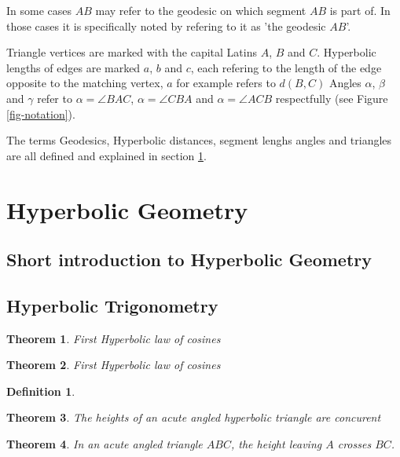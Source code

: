 \documentclass[a4paper,10pt]{article}
\newtheorem{theorem}{Theorem}[section]
\newtheorem{definition}{Definition}[section]
\begin{document}
In some cases $AB$ may refer to the geodesic on which segment $AB$ is part of.
In those cases it is specifically noted by refering to it as 'the geodesic $AB$'.

Triangle vertices are marked with the capital Latins $A$, $B$ and $C$.
Hyperbolic lengths of edges are marked $a$, $b$ and $c$, each refering to 
the length of the edge opposite
to the matching vertex, $a$ for example refers to $d\left(B, C\right)$ 
Angles $\alpha$, $\beta$ and $\gamma$ refer to $\alpha = \angle BAC$, 
$\alpha = \angle CBA$ and $\alpha = \angle ACB$ respectfully
(see Figure \ref{fig-notation}).

The terms Geodesics, Hyperbolic distances, segment lenghs angles and 
triangles are all defined and explained in section \ref{sec-hyperbolicgeom}.


\section{Hyperbolic Geometry}
\label{sec-hyperbolicgeom}
\subsection{Short introduction to Hyperbolic Geometry}
\subsection{Hyperbolic Trigonometry}

\label{cosine1}
\begin{theorem}
First Hyperbolic law of cosines
\end{theorem}

\label{cosine2}
\begin{theorem}
First Hyperbolic law of cosines
\end{theorem}

\label{hyperbolicheightexistance}
\begin{definition}

\end{definition}


\label{hyperbolicheights2}
\begin{theorem}
The heights of an acute angled hyperbolic triangle are concurent
\end{theorem}

\label{hyperbolicheights2}
\begin{theorem}
In an acute angled triangle $ABC$, the height leaving $A$ crosses $BC$.
\end{theorem}
\end{document}
